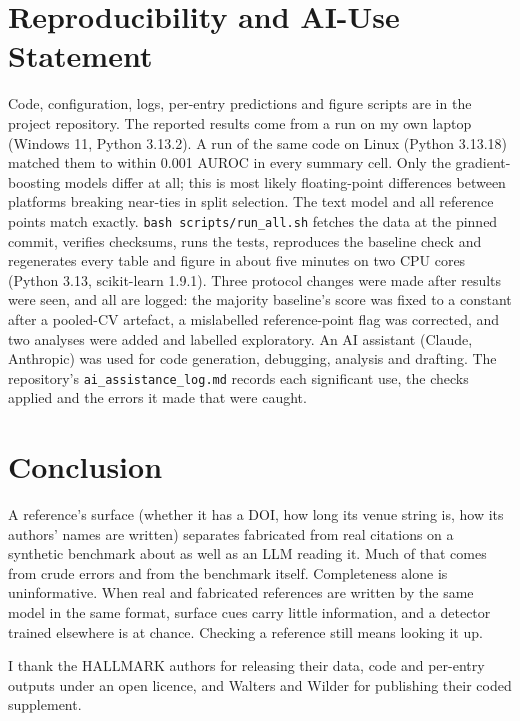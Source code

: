 \documentclass[acmsmall,nonacm]{acmart}
\begin{document}
\section{Reproducibility and AI-Use Statement}
Code, configuration, logs, per-entry predictions and figure scripts are in the project repository. The reported results come from a run on my own laptop (Windows 11, Python 3.13.2). A run of the same code on Linux (Python 3.13.18) matched them to within 0.001 AUROC in every summary cell. Only the gradient-boosting models differ at all; this is most likely floating-point differences between platforms breaking near-ties in split selection. The text model and all reference points match exactly. \texttt{bash scripts/run\_all.sh} fetches the data at the pinned commit, verifies checksums, runs the tests, reproduces the baseline check and regenerates every table and figure in about five minutes on two CPU cores (Python 3.13, scikit-learn 1.9.1). Three protocol changes were made after results were seen, and all are logged: the majority baseline's score was fixed to a constant after a pooled-CV artefact, a mislabelled reference-point flag was corrected, and two analyses were added and labelled exploratory. An AI assistant (Claude, Anthropic) was used for code generation, debugging, analysis and drafting. The repository's \texttt{ai\_assistance\_log.md} records each significant use, the checks applied and the errors it made that were caught.

\section{Conclusion}
A reference's surface (whether it has a DOI, how long its venue string is, how its authors' names are written) separates fabricated from real citations on a synthetic benchmark about as well as an LLM reading it. Much of that comes from crude errors and from the benchmark itself. Completeness alone is uninformative. When real and fabricated references are written by the same model in the same format, surface cues carry little information, and a detector trained elsewhere is at chance. Checking a reference still means looking it up.

\begin{acks}
I thank the HALLMARK authors for releasing their data, code and per-entry outputs under an open licence, and Walters and Wilder for publishing their coded supplement.
\end{acks}



\end{document}

